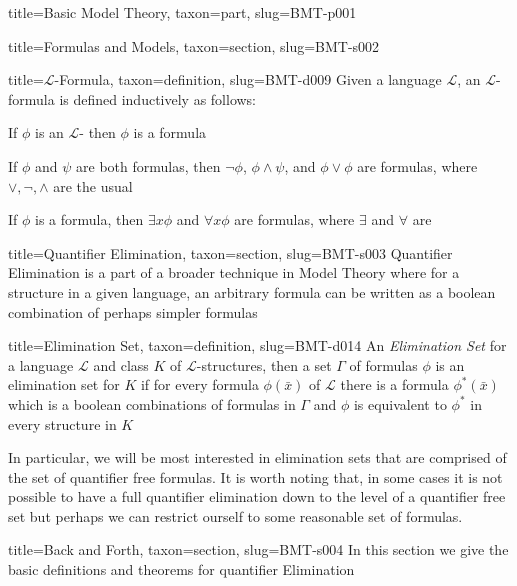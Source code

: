 \documentclass[a4paper]{article}
\begin{document}
\begin{tree}{title={Basic Model Theory}, taxon={part}, slug={BMT-p001}}
\begin{tree}{title={Formulas and Models}, taxon={section}, slug={BMT-s002}}
\begin{tree}{title={\(\mathcal {L}\)-Formula}, taxon={definition}, slug={BMT-d009}}
Given a language \(\mathcal {L}\), an \(\mathcal {L}\)-formula is defined inductively as follows:\par{If \(\phi\) is an \(\mathcal {L}\)- then \(\phi\) is a formula}\par{If \(\phi\) and \(\psi\) are both formulas, then \(\neg \phi\), \(\phi   \land   \psi\), and \(\phi \lor \phi\) are formulas, where \(\lor , \neg , \land\) are the usual }\par{If \(\phi\) is a formula, then \(\exists  x  \phi\) and \(\forall  x  \phi\) are formulas, where \(\exists\) and \(\forall\) are }
\end{tree}

\end{tree}


  
  
\begin{tree}{title={Quantifier Elimination}, taxon={section}, slug={BMT-s003}}
Quantifier Elimination is a part of a broader technique in Model Theory where for a structure in a given language, an arbitrary formula can be written as a boolean combination of perhaps simpler formulas
\begin{tree}{title={Elimination Set}, taxon={definition}, slug={BMT-d014}}
An \emph{Elimination Set} for a language \(\mathcal {L}\) and class \(K\) of \(\mathcal {L}\)-structures, then a set \(\Gamma\) of formulas \(\phi\) is an elimination set for \(K\) if for every formula \(\phi ( \bar {x})\) of \(\mathcal {L}\) there is a formula \(\phi ^*( \bar {x})\) which is a boolean combinations of formulas in \(\Gamma\) and \(\phi\) is equivalent to \(\phi ^*\) in every structure in \(K\)
\end{tree}
\par{In particular, we will be most interested in elimination sets that are comprised of the set of quantifier free formulas. It is worth noting that, in some cases it is not possible to have a full quantifier elimination down to the level of a quantifier free set but perhaps we can restrict ourself to some reasonable set of formulas.}
\end{tree}


  
  
\begin{tree}{title={Back and Forth}, taxon={section}, slug={BMT-s004}}
In this section we give the basic definitions and theorems for quantifier Elimination
\end{tree}



\end{tree}
\end{document}
